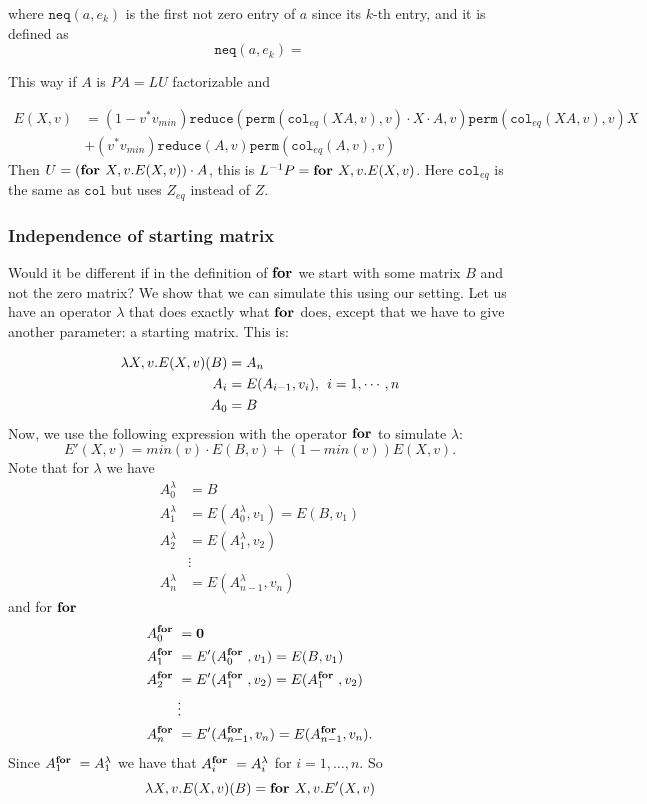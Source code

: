 where $\texttt{neq}(a, e_k)$ is the first not zero entry of $a$ since its $k$-th entry, and it is defined as $$\texttt{neq}(a, e_k)=$$

This way if $A$ is $PA=LU$ factorizable and 

\begin{align*}
	E(X, v)&=(1-v^*v_{min})\texttt{reduce}(\texttt{perm}(\texttt{col}_{eq}(XA,v),v) \cdot X \cdot A,v) \texttt{perm}(\texttt{col}_{eq}(XA,v),v)X \\
	&+ (v^*v_{min})\texttt{reduce}(A,v)\texttt{perm}(\texttt{col}_{eq}(A,v),v)
\end{align*}
Then $U=(\textbf{for } X, v.E(X,v))\cdot A$, this is $L^{-1}P=\textbf{for } X, v.E(X,v)$. Here $\texttt{col}_{eq}$ is the same as $\texttt{col}$ but uses $Z_{eq}$ instead of $Z$.

\subsubsection{Independence of starting matrix}

Would it be different if in the definition of $\textbf{for }$we start with some matrix $B$ and not the zero matrix? We show that we can simulate this using our setting. Let us have an operator $\lambda$ that does exactly what $\textbf{for }$does, except that we have to give another parameter: a starting matrix. This is:

\begin{align*}
\lambda X, v.E(X,v)(B)&=A_n \\
A_i&=E(A_{i-1}, v_{i}),\hspace{1ex}i=1,\cdots, n \\
A_0&=B
\end{align*}
Now, we use the following expression with the operator $\textbf{for }$to simulate $\lambda$: $$E'(X,v)=min(v)\cdot E(B,v)+(1-min(v))E(X,v).$$
Note that for $\lambda$ we have 
\begin{align*}
	A^{\lambda}_0&=B \\
	A^{\lambda}_1&=E(A^{\lambda}_0,v_1)=E(B,v_1) \\
	A^{\lambda}_2&=E(A^{\lambda}_1,v_2) \\
	&\vdots \\
	A^{\lambda}_n&=E(A^{\lambda}_{n-1}, v_n)
\end{align*}
and for $\textbf{for }$
\begin{align*}
	A^{\textbf{for }}_0&=\mathbf{0} \\
	A^{\textbf{for }}_1&=E'(A^{\textbf{for }}_0,v_1)=E(B,v_1) \\
	A^{\textbf{for }}_2&=E'(A^{\textbf{for }}_1,v_2)=E(A^{\textbf{for }}_1,v_2) \\
	&\vdots \\
	A^{\textbf{for }}_n&=E'(A^{\textbf{for }}_{n-1}, v_n)=E(A^{\textbf{for }}_{n-1}, v_n).
\end{align*}
Since $A^{\textbf{for }}_1=A^{\lambda}_1$ we have that $A^{\textbf{for }}_i=A^{\lambda}_i$ for $i=1,\ldots,n$. So $$\lambda X, v.E(X,v)(B)=\textbf{for } X, v.E'(X,v)$$
